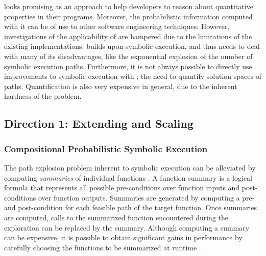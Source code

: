 \documentclass[10pt]{article}
\newcounter{list}
\begin{document}
\PSE{} looks promising as an approach to help developers to reason
about quantitative properties in their programs. Moreover, the
probabilistic information computed with it can be of use to other
software engineering techniques. However, investigations of the
applicability of \PSE{} are hampered due to the limitations of the
existing implementations. \PSE{} builds upon symbolic execution, and
thus needs to deal with many of its disadvantages, like the
exponential explosion of the number of symbolic execution
paths. Furthermore, it is not always possible to directly use
improvements to symbolic execution with \PSE{}; the need to quantify
solution spaces of paths. Quantification is also very expensive in
general, due to the inherent hardness of the problem.






\subsection{Direction 1: Extending and Scaling \PSE{}}
\label{scalePSA}
\subsubsection{ Compositional Probabilistic Symbolic Execution }

The path explosion problem inherent to symbolic execution can be
alleviated by computing \textit{summaries} of individual functions
\cite{godefroid2007compositional}. A function summary is a logical
formula that represents all possible pre-conditions over function
inputs and post-conditions over function outputs. Summaries are
generated by computing a pre- and post-condition for each feasible path
of the target function. Once summaries are computed, calls to the
summarized function encountered during the exploration can be replaced
by the summary. Although computing a summary can be expensive, it is
possible to obtain significant gains in performance by carefully
choosing the functions to be summarized at runtime
\cite{anand2008demand}.
\end{document}

